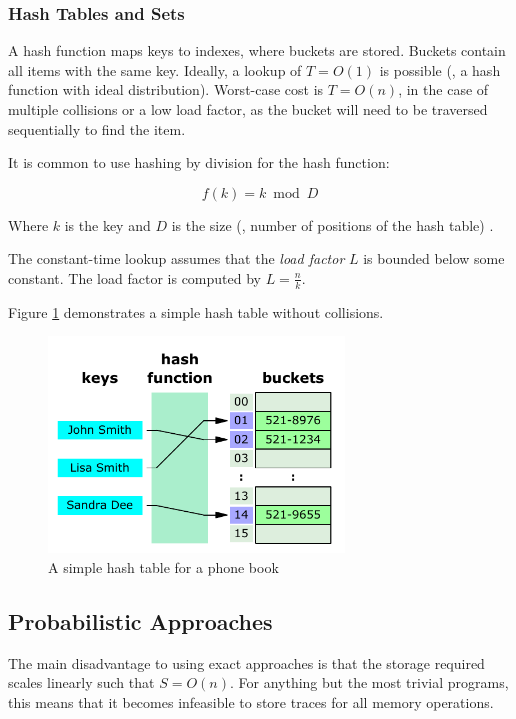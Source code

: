 		\subsubsection{Hash Tables and Sets} \label{sec:runtime/storage/exact/hashing}
		A hash function maps keys to indexes, where buckets are stored. Buckets contain all items with the same key. Ideally, a lookup of $T=O(1)$ is possible (\ie, a hash function with ideal distribution). Worst-case cost is $T=O(n)$, in the case of multiple collisions or a low load factor, as the bucket will need to be traversed sequentially to find the item.
		
		It is common to use hashing by division for the hash function:
		
		\[
			f(k) = k \bmod{D}
		\]
		
		Where $k$ is the key and $D$ is the size (\ie, number of positions of the hash table) \citep{DSandAlgsCpp}.
		
		The constant-time lookup assumes that the \textit{load factor} $L$ is bounded below some constant. The load factor is computed by $L=\frac{n}{k}$.
		
		Figure \ref{fig:hash-table} demonstrates a simple hash table without collisions.
		
		\begin{figure}
			\centering
			\includegraphics[width=0.7\textwidth]{graphics/hash-table.pdf}
			\caption{A simple hash table for a phone book}
			\label{fig:hash-table}
		\end{figure}

	\subsection{Probabilistic Approaches} \label{sec:runtime/storage/probabilistic}
	The main disadvantage to using exact approaches is that the storage required scales linearly such that $S=O(n)$. For anything but the most trivial programs, this means that it becomes infeasible to store traces for all memory operations.
	
